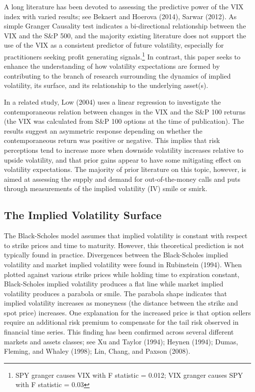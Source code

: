 \documentclass[11pt,a4paper,oldfontcommands]{memoir}
\begin{document}
{A long literature has been devoted to assessing the predictive power of the VIX index with varied results; see Bekaert and Hoerova (2014), Sarwar (2012). As simple Granger Causality test indicates a bi-directional relationship between the VIX and the S\&P 500, and the majority existing literature does not support the use of the VIX as a consistent predictor of future volatility, especially for practitioners seeking profit generating signals.\footnote{SPY granger causes VIX with F statistic = 0.012; VIX granger causes SPY with F statistic = 0.03} In contrast, this paper seeks to enhance the understanding of how volatility expectations are formed by contributing to the branch of research surrounding the dynamics of implied volatility, its surface, and its relationship to the underlying asset(s). 

In a related study, Low (2004) uses a linear regression to investigate the contemporaneous relation between changes in the VIX and the S\&P 100 returns (the VIX was calculated from S\&P 100 options at the time of publication). The results suggest an asymmetric response depending on whether the contemporaneous return was positive or negative. This implies that risk perceptions tend to increase more when downside volatility increases relative to upside volatility, and that prior gains appear to have some mitigating effect on volatility expectations. The majority of prior literature on this topic, however, is aimed at assessing the supply and demand for out-of-the-money calls and puts through measurements of the implied volatility (IV) smile or smirk. 


\subsection{The Implied Volatility Surface}

The Black-Scholes model assumes that implied volatility is constant with respect to strike prices and time to maturity. However, this theoretical prediction is not typically found in practice. Divergences between the Black-Scholes implied volatility and market implied volatility were found in Rubinstein (1994). When plotted against various strike prices while holding time to expiration constant, Black-Scholes implied volatility produces a flat line while market implied volatility produces a parabola or smile. The parabola shape indicates that implied volatility increases as moneyness (the distance between the strike and spot price) increases. One explanation for the increased price is that option sellers require an additional risk premium to compensate for the tail risk observed in financial time series. This finding has been confirmed across several different markets and assets classes; see Xu and Taylor (1994); Heynen (1994); Dumas, Fleming, and Whaley (1998); Lin, Chang, and Paxson (2008).

}
\end{document}
